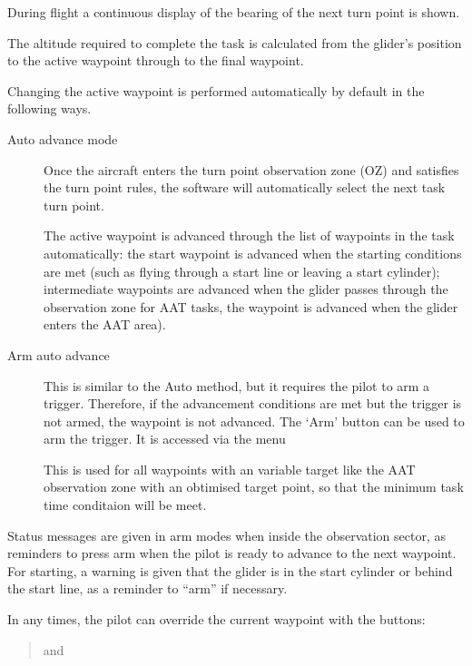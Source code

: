 \documentclass[a4paper,12pt]{refrep}
\begin{document}
During flight a continuous display of the bearing of the next turn
point is shown.

The altitude required to complete the task is calculated from the
glider's position to the active waypoint through to the final
waypoint.

Changing the active waypoint is performed automatically by default in the following ways.
\begin{description}
\item[Auto advance mode]
Once the aircraft enters the turn point observation zone (OZ) and satisfies
the turn point rules, the software will automatically select the next
task turn point.

The active waypoint is advanced through the list of waypoints in the
task automatically: the start waypoint is advanced when the starting
conditions are met (such as flying through a start line or leaving a
start cylinder); intermediate waypoints are advanced when the glider
passes through the observation zone for AAT tasks, the waypoint is
advanced when the glider enters the AAT area).
\item[Arm auto advance]
This is similar to the Auto method, but it requires the pilot to arm a
trigger.  Therefore, if the advancement conditions are met but the
trigger is not armed, the waypoint is not advanced.  The `Arm' button can be 
used to arm the trigger.  It is accessed via the menu
\begin{quote}
\blink{}
\end{quote}
This is used for all waypoints with an variable target like the AAT observation
zone with an obtimised target point, so that the minimum task time
conditaion will be meet.
\end{description}  

Status messages are given in arm modes when inside the observation sector, 
as reminders to press arm when the pilot is ready to advance to the next
waypoint. For starting, a warning is given that the glider is in the start
cylinder or behind the start line, as a reminder to ``arm'' if necessary.

In any times, the pilot can override the current waypoint
with the buttons:

\begin{quote}
\blink{} and
\blink{}
\end{quote}
\end{document}
